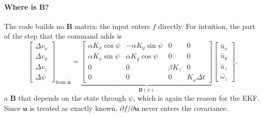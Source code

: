 \paragraph{Where is $\mathbf B$?} The code builds no $\mathbf B$ matrix: the input enters $f$ directly. For intuition,
the part of the step that the command adds is
\begin{equation}
\begin{bmatrix} \Delta v_x\\ \Delta v_y\\ \Delta v_z\\ \Delta\psi\end{bmatrix}_{\text{from }\bar{\mathbf u}}
= \underbrace{\begin{bmatrix}
\alpha K_x\cos\psi & -\alpha K_y\sin\psi & 0 & 0\\
\alpha K_x\sin\psi & \alpha K_y\cos\psi & 0 & 0\\
0 & 0 & \beta K_z & 0\\
0 & 0 & 0 & K_\omega\Delta t
\end{bmatrix}}_{\mathbf B(\psi)}
\begin{bmatrix}\bar u_x\\ \bar u_y\\ \bar u_z\\ \bar\omega_z\end{bmatrix},
\end{equation}
a $\mathbf B$ that depends on the state through $\psi$, which is again the reason for the EKF. Since $\mathbf u$ is treated
as exactly known, $\partial f/\partial\mathbf u$ never enters the covariance.

